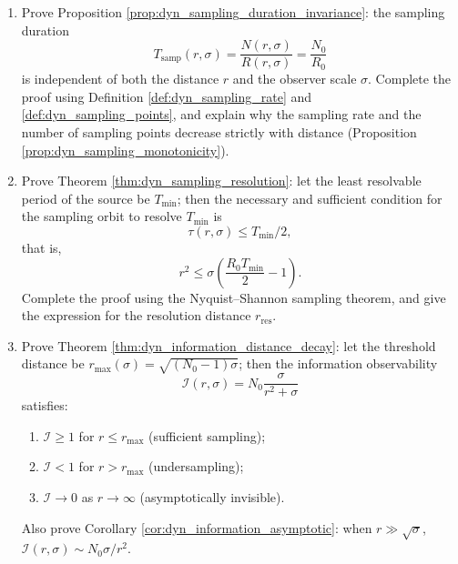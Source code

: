 \begin{enumerate}[leftmargin=3em, label=\textbf{Exercise \arabic*}]
    \item Prove Proposition \ref{prop:dyn_sampling_duration_invariance}:
    the sampling duration
    \[
    T_{\text{samp}}(r,\sigma)=\frac{N(r,\sigma)}{R(r,\sigma)}=\frac{N_0}{R_0}
    \]
    is independent of both the distance $r$ and the observer scale $\sigma$.
    Complete the proof using Definition \ref{def:dyn_sampling_rate} and \ref{def:dyn_sampling_points},
    and explain why the sampling rate and the number of sampling points decrease strictly with distance (Proposition \ref{prop:dyn_sampling_monotonicity}).

    \item Prove Theorem \ref{thm:dyn_sampling_resolution}:
    let the least resolvable period of the source be $T_{\min}$;
    then the necessary and sufficient condition for the sampling orbit to resolve $T_{\min}$ is
    \[
    \tau(r,\sigma)\le T_{\min}/2,
    \]
    that is,
    \[
    r^2\le\sigma\left(\frac{R_0 T_{\min}}{2}-1\right).
    \]
    Complete the proof using the Nyquist--Shannon sampling theorem,
    and give the expression for the resolution distance $r_{\text{res}}$.

    \item Prove Theorem \ref{thm:dyn_information_distance_decay}:
    let the threshold distance be $r_{\max}(\sigma)=\sqrt{(N_0-1)\sigma}$;
    then the information observability
    \[
    \mathcal{I}(r,\sigma)=N_0\frac{\sigma}{r^2+\sigma}
    \]
    satisfies:
    \begin{enumerate}[label=(\roman*)]
        \item $\mathcal{I}\ge1$ for $r\le r_{\max}$ (sufficient sampling);
        \item $\mathcal{I}<1$ for $r>r_{\max}$ (undersampling);
        \item $\mathcal{I}\to0$ as $r\to\infty$ (asymptotically invisible).
    \end{enumerate}
    Also prove Corollary \ref{cor:dyn_information_asymptotic}:
    when $r\gg\sqrt{\sigma}$, $\mathcal{I}(r,\sigma)\sim N_0\sigma/r^2$.


\end{enumerate}
